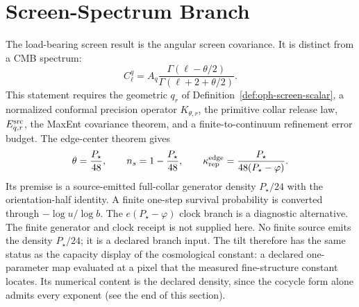 \documentclass[11pt]{article}
\theoremstyle{remark}
\theoremstyle{plain}
\begin{document}
\section{Screen-Spectrum Branch}

The load-bearing screen result is the angular screen covariance. It is
distinct from a CMB spectrum:
\[
  C_\ell^q
  =
  A_q\frac{\Gamma(\ell-\theta/2)}{\Gamma(\ell+2+\theta/2)}.
\]
This statement requires the geometric \(q_r\) of Definition~\ref{def:oph-screen-scalar}, a
normalized conformal precision operator \(K_{\theta,r}\), the primitive collar release law,
\(E^{\rm src}_{q,r}\), the MaxEnt covariance theorem, and a finite-to-continuum refinement error
budget. The edge-center theorem gives
\[
\theta=\frac{P_\star}{48},\qquad
n_s=1-\frac{P_\star}{48},\qquad
\kappa_{\rm rep}^{\rm edge}=\frac{P_\star}{48(P_\star-\varphi)}.
\]
Its premise is a source-emitted full-collar generator density \(P_\star/24\) with the
orientation-half identity. A finite one-step survival probability is converted through
\(-\log u/\log b\). The \(e(P_\star-\varphi)\) clock branch is a diagnostic alternative.
The finite generator and clock receipt is not supplied here. No finite source
emits the density \(P_\star/24\); it is a declared branch input. The tilt
therefore has the same status as the capacity display of the cosmological
constant: a declared one-parameter map evaluated at a pixel that the measured
fine-structure constant locates. Its numerical content is the declared
density, since the cocycle form alone admits every exponent (see the end of
this section).
\end{document}
